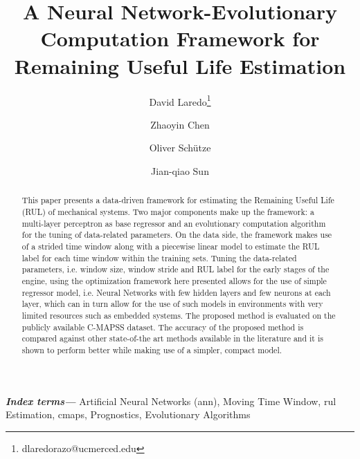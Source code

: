 \documentclass{article}
\title{A Neural Network-Evolutionary Computation Framework for Remaining Useful Life Estimation}
\author[1]{David Laredo\thanks{dlaredorazo@ucmerced.edu}}
\author[1]{Zhaoyin Chen}
\author[2]{Oliver Sch\"utze}
\author[1]{Jian-qiao Sun}
\affil[1]{School of Mechanical Engineering, University of California, Merced}
\affil[2]{Department of Computer Science, CINVESTAV, Mexico City, Mexico}
\date{}
\providecommand{\keywords}[1]{\textbf{\textit{Index terms---}} #1}
\begin{document}
\maketitle %

\thispagestyle{fancy} %


\glsunsetall


\begin{abstract}

\noindent 

This paper presents a data-driven framework for estimating the Remaining Useful Life (RUL) of mechanical systems. Two major components make up the framework: a multi-layer perceptron as base regressor and an evolutionary computation algorithm for the tuning of data-related parameters. On the data side, the framework makes use of a strided time window along with a piecewise linear model to estimate the RUL label for each time window within the training sets. Tuning the data-related parameters, i.e. window size, window stride and RUL label for the early stages of the engine, using the optimization framework here presented allows for the use of simple regressor model, i.e. Neural Networks with few hidden layers and few neurons at each layer, which can in turn allow for the use of such models in environments with very limited resources such as embedded systems. The proposed method is evaluated on the publicly available C-MAPSS dataset. The accuracy of the proposed method is compared against other state-of-the art methods available in the literature and it is shown to perform better while making use of a simpler, compact model.
\end{abstract}

\keywords{Artificial Neural Networks (\gls{ann}), Moving Time Window, \gls{rul} Estimation, \gls{cmaps}, Prognostics, Evolutionary Algorithms}




%
%



\pagebreak








\end{document}
